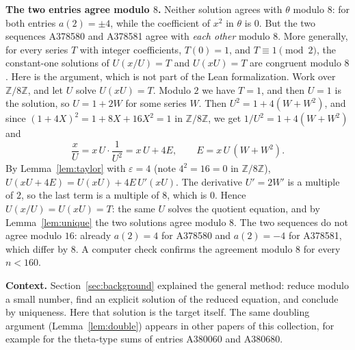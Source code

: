 \documentclass[11pt,a4paper]{article}
\theoremstyle{definition}
\theoremstyle{remark}
\newcommand{\Z}{\mathbb{Z}}
\newcommand{\para}[1]{\par\medskip\noindent\textbf{#1}\enspace}
\begin{document}
\para{The two entries agree modulo $8$.} Neither solution agrees with $\theta$ modulo $8$: for both entries
$a(2)=\pm4$, while the coefficient of $x^2$ in $\theta$ is $0$. But the two sequences A378580 and A378581 agree with
\emph{each other} modulo $8$. More generally, for every series $T$ with integer coefficients, $T(0)=1$, and $T\equiv1\pmod 2$, the
constant-one solutions of $U(x/U)=T$ and $U(xU)=T$ are congruent modulo $8$. Here is the argument, which is not part of the Lean
formalization. Work over $\Z/8\Z$, and let $U$ solve $U(xU)=T$. Modulo $2$ we have $T=1$, and then $U=1$ is the
solution, so $U=1+2W$ for some series $W$. Then $U^2=1+4(W+W^2)$, and since $(1+4X)^2=1+8X+16X^2=1$ in $\Z/8\Z$, we get
$1/U^2=1+4(W+W^2)$ and
\[
\frac xU=x\,U\cdot\frac1{U^2}=x\,U+4E,\qquad E=x\,U\,(W+W^2).
\]
By Lemma~\ref{lem:taylor} with $\varepsilon=4$ (note $4^2=16=0$ in $\Z/8\Z$),
$U(xU+4E)=U(xU)+4E\,U'(xU)$. The derivative $U'=2W'$ is a multiple of $2$, so the last term is a multiple of $8$, which
is $0$. Hence $U(x/U)=U(xU)=T$: the same $U$ solves the quotient equation, and by Lemma~\ref{lem:unique} the two
solutions agree modulo $8$. The two sequences do not agree modulo $16$: already $a(2)=4$ for A378580 and $a(2)=-4$ for
A378581, which differ by $8$. A computer check confirms the agreement modulo $8$ for every $n<160$.

\para{Context.} Section~\ref{sec:background} explained the general method: reduce modulo a small number, find an explicit
solution of the reduced equation, and conclude by uniqueness. Here that solution is the target itself. The same
doubling argument (Lemma~\ref{lem:double}) appears in other papers of this collection, for example for the theta-type
sums of entries A380060 and A380680.
\end{document}
